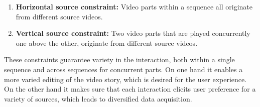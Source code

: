 \begin{enumerate}
  \item \textbf{Horizontal source constraint:} Video parts within a sequence all originate from different source videos.
  \item \textbf{Vertical source constraint:} Two video parts that are played concurrently one above the other, originate from different source videos.
\end{enumerate}

These constraints guarantee variety in the interaction, both within a single sequence and across sequences for concurrent parts. On one hand it enables a more varied editing of the video story, which is desired for the user experience. On the other hand it makes sure that each interaction elicits user preference for a variety of sources, which leads to diversified data acquisition.

